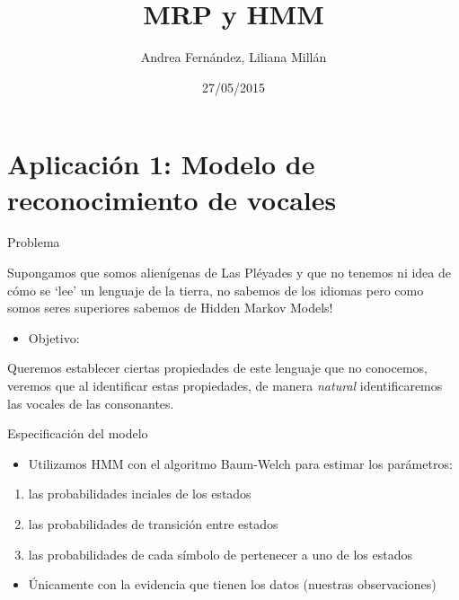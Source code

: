 \documentclass[ignorenonframetext,]{beamer}
\title{MRP y HMM}
\author{Andrea Fernández, Liliana Millán}
\date{27/05/2015}
\begin{document}
\frame{\titlepage}

\section{Aplicación 1: Modelo de reconocimiento de
vocales}\label{aplicacion-1-modelo-de-reconocimiento-de-vocales}

\begin{frame}{Problema}

Supongamos que somos alienígenas de Las Pléyades y que no tenemos ni
idea de cómo se `lee' un lenguaje de la tierra, no sabemos de los
idiomas pero como somos seres superiores sabemos de Hidden Markov
Models!

\begin{itemize}
\itemsep1pt\parskip0pt
\item
  Objetivo:
\end{itemize}

Queremos establecer ciertas propiedades de este lenguaje que no
conocemos, veremos que al identificar estas propiedades, de manera
\emph{natural} identificaremos las vocales de las consonantes.

\end{frame}

\begin{frame}{Especificación del modelo}

\begin{itemize}
\itemsep1pt\parskip0pt
\item
  Utilizamos HMM con el algoritmo Baum-Welch para estimar los
  parámetros:
\end{itemize}

\begin{enumerate}
\def\labelenumi{\arabic{enumi}.}
\itemsep1pt\parskip0pt
\item
  las probabilidades inciales de los estados
\item
  las probabilidades de transición entre estados
\item
  las probabilidades de cada símbolo de pertenecer a uno de los estados
\end{enumerate}

\begin{itemize}
\itemsep1pt\parskip0pt
\item
  Únicamente con la evidencia que tienen los datos (nuestras
  observaciones)
\end{itemize}

\end{frame}
\end{document}
